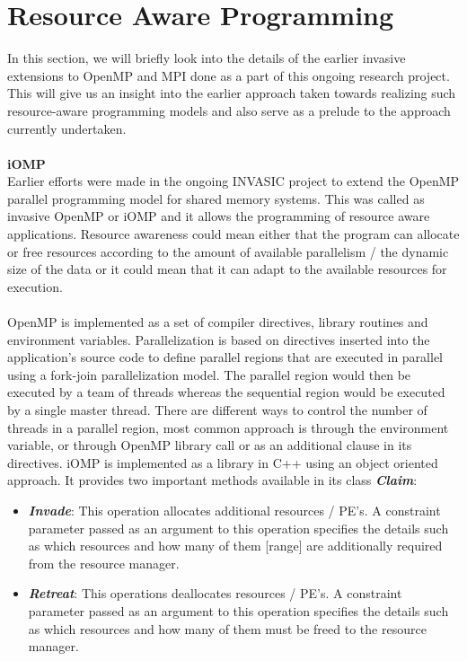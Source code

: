 \section{Resource Aware Programming}
In this section, we will briefly look into the details of the earlier invasive extensions to OpenMP and MPI done as a part of this ongoing research project. This will give us an insight into the earlier approach taken towards realizing such resource-aware programming models and also serve as a prelude to the approach currently undertaken.\\ \\
\textbf{iOMP}\\
Earlier efforts were made in the ongoing INVASIC project to extend the OpenMP parallel programming model for shared memory systems. This was called as invasive OpenMP or iOMP and it allows the programming of resource aware applications. Resource awareness could mean either that the program can allocate or free resources according to the amount of available parallelism / the dynamic size of the data or it could mean that it can adapt to the available resources for execution.\\ \\
OpenMP is implemented as a set of compiler directives, library routines and environment variables. Parallelization is based on directives inserted into the application's source code to define parallel regions that are executed in parallel using a fork-join parallelization model. The parallel region would then be executed by a team of threads whereas the sequential region would be executed by a single master thread. There are different ways to control the number of threads in a parallel region, most common approach is through the environment variable, or through OpenMP library call or as an additional clause in its directives. iOMP is implemented as a library in C++ using an object oriented approach. It provides two important methods available in its class \textbf{\textit{Claim}}:
\begin{itemize}
\item \textbf{\textit{Invade}}: This operation allocates additional resources / PE's. A constraint parameter passed as an argument to this operation specifies the details such as which resources and how many of them [range] are additionally required from the resource manager.
\item \textbf{\textit{Retreat}}: This operations deallocates resources / PE's. A constraint parameter passed as an argument to this operation specifies the details such as which resources and how many of them must be freed to the resource manager.
\end{itemize}
